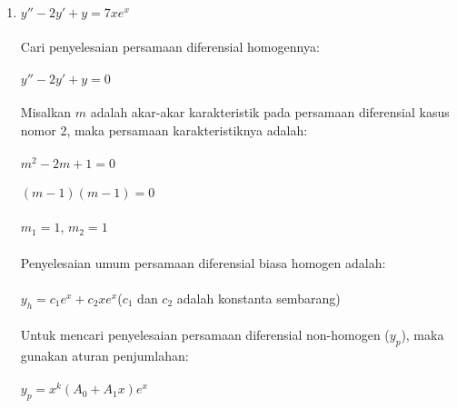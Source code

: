 \begin{enumerate}[1.]
	\item \begin{math} y'' - 2y' + y = 7xe^{x} \end{math} \\ \\
	Cari penyelesaian persamaan diferensial homogennya: \\ \\
	\begin{math} y'' - 2y' + y = 0 \end{math} \\ \\
	Misalkan \begin{math} m \end{math} adalah akar-akar karakteristik pada persamaan diferensial kasus nomor 2, maka persamaan karakteristiknya adalah: \\ \\
	\begin{math} m^{2} - 2m + 1 = 0 \end{math} \\ \\
	\begin{math} (m - 1) (m - 1) = 0 \end{math} \\ \\
	\begin{math} m_1 = 1 \end{math}, \begin{math} m_2 = 1 \end{math} \\ \\
	Penyelesaian umum persamaan diferensial biasa homogen adalah: \\ \\
	\begin{math} y_h = c_1 e^{x} + c_2 xe^{x} \end{math}(\begin{math} c_1 \end{math} dan \begin{math} c_2 \end{math} adalah konstanta sembarang) \\ \\
	Untuk mencari penyelesaian persamaan diferensial non-homogen (\begin{math} y_p \end{math}), maka gunakan aturan penjumlahan: \\ \\
	\begin{math} y_p = x^{k} (A_0 + A_1 x) e^{x} \end{math} \\ \\

\end{enumerate}
